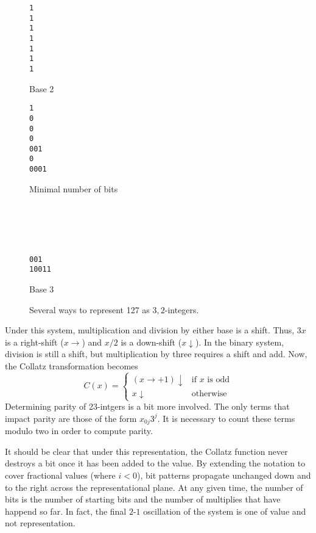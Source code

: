 \documentclass{article}
\begin{document}
\begin{figure}
  \begin{multicols}{3}
\begin{verbatim}
1
1
1
1
1
1
1
\end{verbatim}
Base 2
\columnbreak
\begin{verbatim}
1
0
0
0
001
0
0001
\end{verbatim}
Minimal number of bits
\columnbreak
\begin{verbatim}





001
10011
\end{verbatim}
Base 3
  \end{multicols}

  \caption{Several ways to represent 127 as ${3,2}$-integers.}
\end{figure}
Under this system, multiplication and division by either base is a shift. Thus, $3x$ is a
right-shift ($x\rightarrow$) and $x/2$ is a down-shift ($x\downarrow$). In the binary system,
division is still a shift, but multiplication by three requires a shift and add. Now, the
Collatz transformation becomes
\begin{equation}
  C(x) = \begin{cases}
    (x\rightarrow + 1)\downarrow & \text{if } x \text{ is odd}\\
    x\downarrow & \text{otherwise}
    \end{cases}
\end{equation}
Determining parity of {23}-intgers is a bit more involved. The only terms that impact
parity are those of the form $x_{0j}3^j$. It is necessary to count these terms modulo two
in order to compute parity.

It should be clear that under this representation, the Collatz function never
destroys a bit once it has been added to the value. By extending the notation
to cover fractional values (where $i<0$), bit patterns propagate unchanged down
and to the right across the representational plane.  At any given time, the
number of bits is the number of starting bits and the number of multiplies that
have happend so far. In fact, the final $2$-$1$ oscillation of the system is
one of value and not representation.
\end{document}

